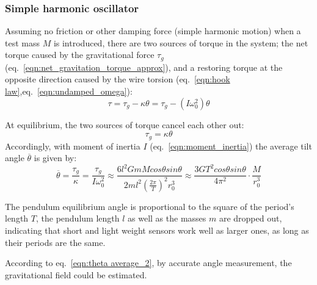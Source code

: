 \documentclass[\main/master.tex]{subfiles}
\begin{document}
\subsubsection{Simple harmonic oscillator}
Assuming no friction or other damping force (simple harmonic motion) when a test mass $M$ is introduced, there are two sources of torque in the system; the net torque caused by the gravitational force $\tau_g$ (eq.~\ref{eqn:net_gravitation_torque_approx}), and a restoring torque at the opposite direction caused by the wire torsion (eq.~\ref{eqn:hook law},eq.~\ref{eqn:undamped_omega}):
\begin{equation}
\tau = \tau_g - \kappa\theta = \tau_g - (I\omega_0^2)\theta    \label{eqn:gravitation_torque}
\end{equation}
\par\noindent
At equilibrium, the two sources of torque cancel each other out:
\begin{equation}
\tau_g =  \kappa\theta    \label{eqn:gravitation_torque_equilibrium}
\end{equation}
Accordingly, with moment of inertia $I$ (eq.~\ref{eqn:moment_inertia}) the average tilt angle  $\overline{\theta}$ is given by:
\begin{equation}
\overline{\theta} = \frac{\tau_g}{\kappa} =\frac{\tau_g}{I\omega_0^2}  \approx \frac{6l^2GmMcos\theta sin\theta}{2ml^2 (\frac{2\pi}{T})^2 r_0^3} \approx \frac{3GT^2cos\theta sin\theta}{4\pi^2 } \cdot \frac{M}{r_0^3}  \label{eqn:theta average}
\end{equation} 

\par\noindent
The pendulum equilibrium angle is proportional to the square of the period's length $T$, the pendulum length $l$ as well as the masses $m$ are dropped out, indicating that short and light weight sensors work well as larger ones, as long as their periods are the same.
\par\noindent
According to eq.~\ref{eqn:theta average_2}, by accurate angle measurement, the gravitational field could be estimated.
 
\end{document}
